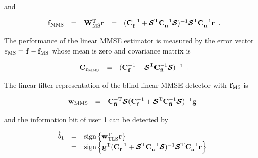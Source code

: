\documentclass[a4paper,11pt,fleqn]{article}
\newcommand{\br}{{\mathbf r}}
\newcommand{\bC}{{\bf C}}
\newcommand{\bg}{{\bf g}}
\newcommand{\bn}{{\bf n}}
\newcommand{\bw}{{\bf w}}
\newcommand{\bbf}{{\bf f}}
\newcommand{\bW}{{\bf W}}
\newcommand{\bcS}{{\mbox {\boldmath ${\cal S}$}}}
\begin{document}
\noindent and

\begin{equation}
\begin{array}{rcccl}
{\bbf}_{\rm MMS} &=&{\bW}_{\rm MS}^{\rm T}\br
&=&(\bC_{\bbf}^{-1}+\bcS^{\rm
T}\bC_{\bar{\bn}}^{-1}\bcS)^{-1}\bcS^{\rm
T}\bC_{\bar{\bn}}^{-1}\br
\end{array}. \label{MSE}
\end{equation}

\noindent The performance of the linear MMSE estimator is measured
by the error vector $\mathbf{\varepsilon_{\rm MS}}=\bbf-\bbf_{\rm
MS}$ whose mean is zero and covariance matrix is

\begin{equation}
\begin{array}{rcl}
\bC_{\mathbf{\varepsilon_{\rm MMS}}} &=&
(\bC_{\bbf}^{-1}+\bcS^{\rm T}\bC_{\bar{\bn}}^{-1}\bcS)^{-1}
\end{array}.
\end{equation}

The linear filter representation of the blind linear MMSE detector
with $\bbf_{\rm MS}$ is

\begin{equation}
\begin{array}{rcl}
{\bw}_{\rm MMS}&=& \bC_{\bar{\bn}}^{-\rm
T}\bcS(\bC_{\bbf}^{-1}+\bcS^{\rm
T}\bC_{\bar{\bn}}^{-1}\bcS)^{-1}\bg
\end{array} \label{w_MSE}
\end{equation}

\noindent and the information bit of user 1 can be detected by

\begin{equation}
\begin{array}{rcl}
\hat{b}_1&=&\mbox{sign}\left\{\bw_{\rm TLS}^{\rm T}\br\right\}\\
&=&\mbox{sign}\left\{\bg^{\rm T}(\bC_{\bbf}^{-1}+\bcS^{\rm
T}\bC_{\bar{\bn}}^{-1}\bcS)^{-1}\bcS^{\rm
T}\bC_{\bar{\bn}}^{-1}\br\right\}
\end{array}
\end{equation}


\pagebreak
\end{document}
